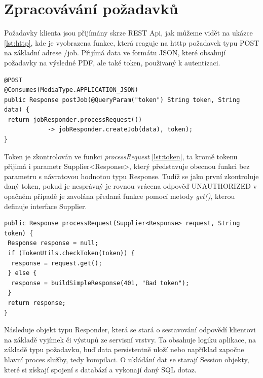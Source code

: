 \section{Zpracovávání požadavků} \label{proRequests}
Požadavky klienta jsou přijímány skrze REST Api, jak můžeme vidět na ukázce \ref{lst:http}, kde je vyobrazena funkce, která reaguje na htttp požadavek typu POST na základní adrese /job. Přijímá data ve formátu JSON, které obsahují požadavky na výsledné PDF, ale také token, použivaný k autentizaci.    

\begin{lstlisting}[caption=Funkce pro přijímání HTTP požadavků, label={lst:http}]
@POST
@Consumes(MediaType.APPLICATION_JSON)
public Response postJob(@QueryParam("token") String token, String data) {
 return jobResponder.processRequest(() 
			-> jobResponder.createJob(data), token);
}
\end{lstlisting} 

Token je zkontrolován ve funkci \textit{processRequest} \ref{lst:token}, ta kromě tokenu přijimá i parametr Supplier<Response>, který představuje obecnou funkci bez parametru s návratovou hodnotou typu Response. Tudíž se jako první zkontroluje daný token, pokud je nesprávný je rovnou vrácena odpověď UNAUTHORIZED v opačném případě je zavolána předaná funkce pomocí metody \textit{get()}, kterou definuje interface Supplier.   
\newpage
\begin{lstlisting}[caption=Funkce na ověření tokenu v požadavku, label={lst:token}]
public Response processRequest(Supplier<Response> request, String token) {
 Response response = null;
 if (TokenUtils.checkToken(token)) {
  response = request.get();
 } else {
  response = buildSimpleResponse(401, "Bad token");
 }
 return response;
}
\end{lstlisting}

Následuje objekt typu Responder, která se stará o sestavování odpovědí klientovi na základě vyjímek či výstupů ze servisní vrstvy. Ta obsahuje logiku aplikace, na základě typu požadavku, buď data persistentně uloží nebo například započne hlavní proces služby, tedy kompilaci. O ukládání dat se starají Session objekty, které si získají spojení s databází a vykonají daný SQL dotaz.

